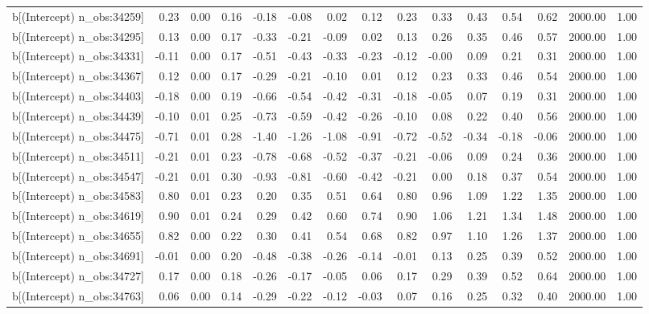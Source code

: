 \begin{table}[ht]
\begin{tabular}{rrrrrrrrrrrrrrr}
  b[(Intercept) n\_obs:34259] & 0.23 & 0.00 & 0.16 & -0.18 & -0.08 & 0.02 & 0.12 & 0.23 & 0.33 & 0.43 & 0.54 & 0.62 & 2000.00 & 1.00 \\ 
  b[(Intercept) n\_obs:34295] & 0.13 & 0.00 & 0.17 & -0.33 & -0.21 & -0.09 & 0.02 & 0.13 & 0.26 & 0.35 & 0.46 & 0.57 & 2000.00 & 1.00 \\ 
  b[(Intercept) n\_obs:34331] & -0.11 & 0.00 & 0.17 & -0.51 & -0.43 & -0.33 & -0.23 & -0.12 & -0.00 & 0.09 & 0.21 & 0.31 & 2000.00 & 1.00 \\ 
  b[(Intercept) n\_obs:34367] & 0.12 & 0.00 & 0.17 & -0.29 & -0.21 & -0.10 & 0.01 & 0.12 & 0.23 & 0.33 & 0.46 & 0.54 & 2000.00 & 1.00 \\ 
  b[(Intercept) n\_obs:34403] & -0.18 & 0.00 & 0.19 & -0.66 & -0.54 & -0.42 & -0.31 & -0.18 & -0.05 & 0.07 & 0.19 & 0.31 & 2000.00 & 1.00 \\ 
  b[(Intercept) n\_obs:34439] & -0.10 & 0.01 & 0.25 & -0.73 & -0.59 & -0.42 & -0.26 & -0.10 & 0.08 & 0.22 & 0.40 & 0.56 & 2000.00 & 1.00 \\ 
  b[(Intercept) n\_obs:34475] & -0.71 & 0.01 & 0.28 & -1.40 & -1.26 & -1.08 & -0.91 & -0.72 & -0.52 & -0.34 & -0.18 & -0.06 & 2000.00 & 1.00 \\ 
  b[(Intercept) n\_obs:34511] & -0.21 & 0.01 & 0.23 & -0.78 & -0.68 & -0.52 & -0.37 & -0.21 & -0.06 & 0.09 & 0.24 & 0.36 & 2000.00 & 1.00 \\ 
  b[(Intercept) n\_obs:34547] & -0.21 & 0.01 & 0.30 & -0.93 & -0.81 & -0.60 & -0.42 & -0.21 & 0.00 & 0.18 & 0.37 & 0.54 & 2000.00 & 1.00 \\ 
  b[(Intercept) n\_obs:34583] & 0.80 & 0.01 & 0.23 & 0.20 & 0.35 & 0.51 & 0.64 & 0.80 & 0.96 & 1.09 & 1.22 & 1.35 & 2000.00 & 1.00 \\ 
  b[(Intercept) n\_obs:34619] & 0.90 & 0.01 & 0.24 & 0.29 & 0.42 & 0.60 & 0.74 & 0.90 & 1.06 & 1.21 & 1.34 & 1.48 & 2000.00 & 1.00 \\ 
  b[(Intercept) n\_obs:34655] & 0.82 & 0.00 & 0.22 & 0.30 & 0.41 & 0.54 & 0.68 & 0.82 & 0.97 & 1.10 & 1.26 & 1.37 & 2000.00 & 1.00 \\ 
  b[(Intercept) n\_obs:34691] & -0.01 & 0.00 & 0.20 & -0.48 & -0.38 & -0.26 & -0.14 & -0.01 & 0.13 & 0.25 & 0.39 & 0.52 & 2000.00 & 1.00 \\ 
  b[(Intercept) n\_obs:34727] & 0.17 & 0.00 & 0.18 & -0.26 & -0.17 & -0.05 & 0.06 & 0.17 & 0.29 & 0.39 & 0.52 & 0.64 & 2000.00 & 1.00 \\ 
  b[(Intercept) n\_obs:34763] & 0.06 & 0.00 & 0.14 & -0.29 & -0.22 & -0.12 & -0.03 & 0.07 & 0.16 & 0.25 & 0.32 & 0.40 & 2000.00 & 1.00 \\ 

\end{tabular}
\end{table}
